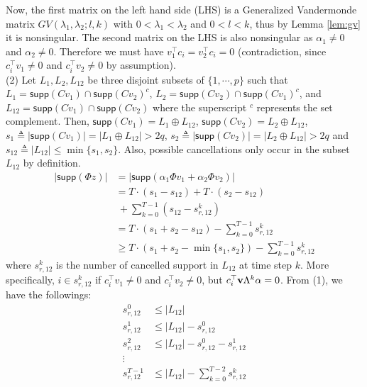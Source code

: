 \documentclass[../thesis.tex]{subfiles}
\begin{document}
Now, the first matrix on the left hand side (LHS) is a Generalized Vandermonde matrix $GV(\lambda_1,\lambda_2;l, k)$ with $0<\lambda_1< \lambda_2$ and $0< l<k$, thus by Lemma \ref{lem:gv} it is nonsingular. The second matrix on the LHS is also nonsingular as $\alpha_1 \neq 0$ and $\alpha_2 \neq 0$. Therefore we must have $v_1^\top c_i = v_2^\top c_i = 0$ (contradiction, since $c_i^\top v_1 \neq 0$ and $c_i^\top v_2 \neq 0$ by assumption).\\

(2) Let $L_1, L_2, L_{12}$ be three disjoint subsets of $\{1,\cdots, p\}$ such that $L_1 = \textsf{supp} (C v_1) \cap \textsf{supp}(C v_2)^c $, $L_2 = \textsf{supp} (Cv_2) \cap \textsf{supp} (C v_1)^c $, and $L_{12} = \textsf{supp} (C v_1) \cap \textsf{supp} (C v_2)$ where the superscript $^c$ represents the set complement. Then, $\textsf{supp} (C v_1)  = L_1 \oplus L_{12}$, $\textsf{supp} (C v_2)  = L_2 \oplus L_{12}$, $ s_1 \triangleq \lvert \textsf{supp} (C v_1) \rvert = \lvert  L_1 \oplus L_{12} \rvert > 2q$,  $s_2 \triangleq \lvert \textsf{supp} ( C v_2) \rvert =  \lvert L_2 \oplus L_{12} \rvert > 2q $ and $s_{12} \triangleq \lvert  L_{12} \rvert \le \min \{s_1, s_2\}$. 
Also, possible cancellations only occur in the subset $L_{12}$ by definition. 
\begin{equation}
\begin{aligned}
	\lvert \textsf{supp} (\Phi z) \rvert &= \lvert \textsf{supp} (\alpha_1 \Phi v_1 + \alpha_2 \Phi v_2) \vert  \\&= T \cdot (s_1 - s_{12}) + T\cdot (s_2 - s_{12}) \\ &~+ \sum_{k=0}^{T-1} (s_{12}- s_{r,12}^k) \\
	&=T \cdot (s_1 + s_2 - s_{12}) - \sum_{k=0}^{T-1} s_{r,12}^k \\&
	\ge T  \cdot(s_1 + s_2 - \min \{ s_1, s_2 \}) - \sum_{k=0}^{T-1} s_{r,12}^k \nonumber
\end{aligned}
\end{equation}
where $s_{r,12}^k$ is the number of cancelled support in $L_{12}$ at time step $k$. 
More specifically, $i \in s_{r,12}^k$ if $c_i^\top v_1 \neq 0$ and $c_i^\top v_2 \neq 0$, but $c_i^\top{\bf v}\Lambda^k \alpha = 0$.
From (1), we have the followings:
\begin{equation}
\begin{aligned}
	s_{r,12}^0 &\le \lvert L_{12} \rvert \\
	s_{r,12}^1 &\le \lvert L_{12} \rvert - s_{r,12}^0 \\
	s_{r,12}^2 &\le \lvert L_{12} \rvert - s_{r,12}^0 - s_{r,12}^1 \\
	\vdots & \\
	s_{r,12}^{T-1} & \le \lvert L_{12} \rvert - \sum_{k=0}^{T-2} s_{r,12}^k \nonumber 
\end{aligned}
\end{equation}
\end{document}
